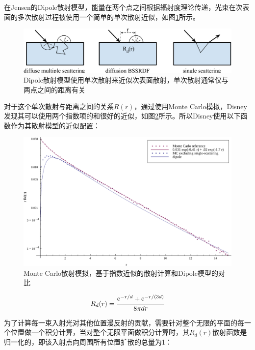 在Jensen的Dipole散射模型，能量在两个点之间根据辐射度理论传递，光束在次表面的多次散射过程被使用一个简单的单次散射近似，如图\ref{f:intro-bssrdf}所示。

\begin{figure}
	\includegraphics[width=\textwidth]{figures/intro/bssrdf}
	\caption{Dipole散射模型使用单次散射来近似次表面散射，单次散射通常仅与两点之间的距离有关}
	\label{f:intro-bssrdf}
\end{figure}

对于这个单次散射与距离之间的关系$R(r)$，通过使用Monte Carlo模拟，Disney发现其可以使用两个指数项的和很好的近似，如图\ref{f:intro-bssrdf-r}所示。所以Disney使用以下函数作为其散射模型的近似配置：

\begin{figure}
\begin{fullwidth}
	\includegraphics[width=\thewidth]{figures/intro/monteCarloFit}
	\caption{Monte Carlo散射模拟，基于指数近似的散射计算和Dipole模型的对比}
	\label{f:intro-bssrdf-r}
\end{fullwidth}
\end{figure}

\begin{equation}
	R_d(r)= \cfrac{{\rm e}^{-r/d}+{\rm e}^{-r/(3d)}}{8\pi dr}
\end{equation}

\noindent 为了计算每一束入射光对其他位置漫反射的贡献，需要针对整个无限的平面的每一个位置做一个积分计算，当对整个无限平面做积分计算时，其$R_d(r)$散射函数是归一化的，即该入射点向周围所有位置扩散的总量为1：

